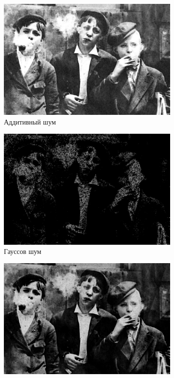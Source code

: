 \begin{figure}[ht]
\begin{subfigure}[b]{0.5\linewidth}
      \includegraphics[width=0.95\linewidth]{../Rang_Filter/Rang_Additive_noise_(k=5,r=1).jpg} 
      \caption{Аддитивный шум} 
      \label{rang_5_1:c} 
      \vspace{4ex}
    \end{subfigure}%
    \begin{subfigure}[b]{0.5\linewidth}
      \centering
      \includegraphics[width=0.95\linewidth]{../Rang_Filter/Rang_Gaussian_noise_(k=5,r=1).jpg} 
      \caption{Гауссов шум} 
      \label{rang_5_1:d} 
      \vspace{4ex}
    \end{subfigure}
    \begin{subfigure}[b]{0.5\linewidth}
      \centering
      \includegraphics[width=0.95\linewidth]{../Rang_Filter/Rang_Poisson_noise_(k=5,r=1).jpg} 

\end{subfigure}
\end{figure}
